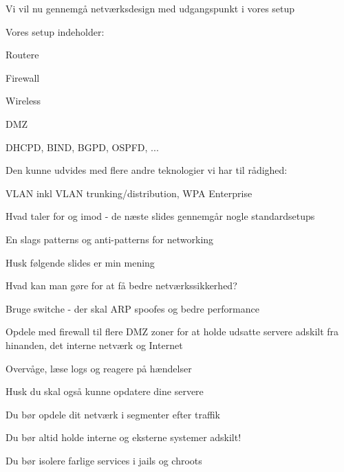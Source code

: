 \documentclass[Screen16to9,17pt]{foils}
\begin{document}
\begin{list1}
\item Vi vil nu gennemgå netværksdesign med udgangspunkt i vores setup
\item Vores setup indeholder:
\begin{list2}
\item Routere
\item Firewall
\item Wireless
\item DMZ
\item DHCPD, BIND, BGPD, OSPFD, ...
\end{list2}
\item Den kunne udvides med flere andre teknologier vi har til rådighed:
\begin{list2}
\item VLAN inkl VLAN trunking/distribution, WPA Enterprise
\end{list2}
\item Hvad taler for og imod - de næste slides gennemgår nogle standardsetups
\item En slags patterns og
anti-patterns for networking
\item Husk følgende slides er min mening
\end{list1}






\begin{list1}
\item Hvad kan man gøre for at få bedre netværkssikkerhed?
\begin{list2}
\item Bruge switche - der skal ARP spoofes og bedre performance
\item Opdele med firewall til flere DMZ zoner for at holde
      udsatte servere adskilt fra hinanden, det interne netværk og
      Internet
\item Overvåge, læse logs og reagere på hændelser
\end{list2}
\item Husk du skal også kunne opdatere dine servere
\end{list1}



\begin{list1}
\item Du bør opdele dit netværk i segmenter efter traffik
\item Du bør altid holde interne og eksterne systemer adskilt!
\item Du bør isolere farlige services i jails og chroots
\end{list1}
\end{document}
